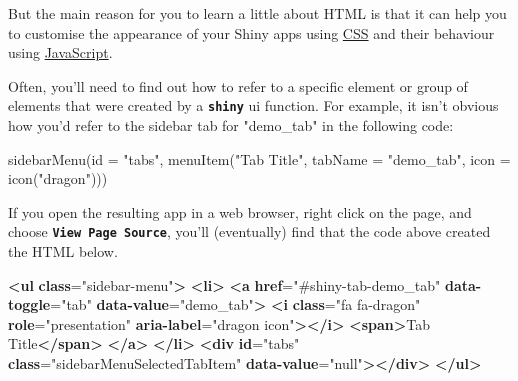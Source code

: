 \documentclass[
  oneside]{book}
\newenvironment{Shaded}{\begin{snugshade}}{\end{snugshade}}
\newcommand{\AttributeTok}[1]{\textcolor[rgb]{0.77,0.63,0.00}{#1}}
\newcommand{\ErrorTok}[1]{\textcolor[rgb]{0.64,0.00,0.00}{\textbf{#1}}}
\newcommand{\FunctionTok}[1]{\textcolor[rgb]{0.00,0.00,0.00}{#1}}
\newcommand{\KeywordTok}[1]{\textcolor[rgb]{0.13,0.29,0.53}{\textbf{#1}}}
\newcommand{\NormalTok}[1]{#1}
\newcommand{\OtherTok}[1]{\textcolor[rgb]{0.56,0.35,0.01}{#1}}
\newcommand{\StringTok}[1]{\textcolor[rgb]{0.31,0.60,0.02}{#1}}
\begin{document}
But the main reason for you to learn a little about HTML is that it can help you to customise the appearance of your Shiny apps using \protect\hyperlink{CSS}{CSS} and their behaviour using \protect\hyperlink{JavaScript}{JavaScript}.

Often, you'll need to find out how to refer to a specific element or group of elements that were created by a \textbf{\texttt{shiny}} ui function. For example, it isn't obvious how you'd refer to the sidebar tab for \StringTok{"demo\_tab"} in the following code:

\begin{Shaded}
\begin{Highlighting}[]
\FunctionTok{sidebarMenu}\NormalTok{(}\AttributeTok{id =} \StringTok{"tabs"}\NormalTok{, }\FunctionTok{menuItem}\NormalTok{(}\StringTok{"Tab Title"}\NormalTok{, }\AttributeTok{tabName =} \StringTok{"demo\_tab"}\NormalTok{, }\AttributeTok{icon =} \FunctionTok{icon}\NormalTok{(}\StringTok{"dragon"}\NormalTok{)))}
\end{Highlighting}
\end{Shaded}

If you open the resulting app in a web browser, right click on the page, and choose \textbf{\texttt{View\ Page\ Source}}, you'll (eventually) find that the code above created the HTML below.

\begin{Shaded}
\begin{Highlighting}[]
\KeywordTok{\textless{}ul} \ErrorTok{class}\OtherTok{=}\StringTok{"sidebar{-}menu"}\KeywordTok{\textgreater{}}
  \KeywordTok{\textless{}li\textgreater{}}
    \KeywordTok{\textless{}a} \ErrorTok{href}\OtherTok{=}\StringTok{"\#shiny{-}tab{-}demo\_tab"} \ErrorTok{data{-}toggle}\OtherTok{=}\StringTok{"tab"} \ErrorTok{data{-}value}\OtherTok{=}\StringTok{"demo\_tab"}\KeywordTok{\textgreater{}}
      \KeywordTok{\textless{}i} \ErrorTok{class}\OtherTok{=}\StringTok{"fa fa{-}dragon"} \ErrorTok{role}\OtherTok{=}\StringTok{"presentation"} \ErrorTok{aria{-}label}\OtherTok{=}\StringTok{"dragon icon"}\KeywordTok{\textgreater{}\textless{}/i\textgreater{}}
      \KeywordTok{\textless{}span\textgreater{}}\NormalTok{Tab Title}\KeywordTok{\textless{}/span\textgreater{}}
    \KeywordTok{\textless{}/a\textgreater{}}
  \KeywordTok{\textless{}/li\textgreater{}}
  \KeywordTok{\textless{}div} \ErrorTok{id}\OtherTok{=}\StringTok{"tabs"} \ErrorTok{class}\OtherTok{=}\StringTok{"sidebarMenuSelectedTabItem"} \ErrorTok{data{-}value}\OtherTok{=}\StringTok{"null"}\KeywordTok{\textgreater{}\textless{}/div\textgreater{}}
\KeywordTok{\textless{}/ul\textgreater{}}
\end{Highlighting}
\end{Shaded}
\end{document}
